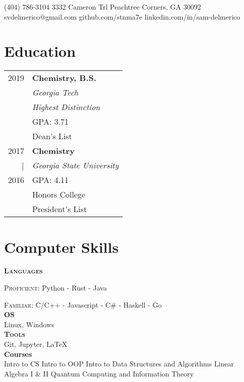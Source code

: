 \documentclass{tccv}
\begin{document}
    {(404) 786-3104}
    {3332 Cameron Trl}
    {Peachtree Corners, GA 30092}
    {svdelmerico@gmail.com}
    {github.com/stnma7e}
    {linkedin.com/in/sam-delmerico}

\begin{minipage}[t]{0.35\textwidth}
    \section{Education}
    \begin{tabular}{rl}
        2019 & \textbf{Chemistry, B.S.} \\
             & \emph{Georgia Tech} \\
             & \emph{Highest Distinction} \\
             & GPA: 3.71 \\
             & Dean's List \\
        
        2017 & \textbf{Chemistry} \\
        |    & \emph{Georgia State University} \\
        2016 & GPA: 4.11 \\
             & Honors College \\
             & President's List
    \end{tabular}

    \section{Computer Skills}
    \textbf{\textsc{Languages}}
    
    \textsc{Proficient:} Python - Rust - Java
    
    \textsc{Familiar:}
    {
        C/C++ - Javascript - C\# - Haskell - Go
    } \\
    
    \textbf{\textsc{OS}} \\
        Linux, Windows \\
    
    \textbf{\textsc{Tools}} \\
        Git, Jupyter, \LaTeX{} \\
    
    \textbf{Courses} \\
        Intro to CS \newline
        Intro to OOP \newline
        Intro to Data Structures and Algorithms \newline
        Linear Algebra I \& II \newline
        Quantum Computing and Information Theory
        

\end{minipage}
\end{document}
